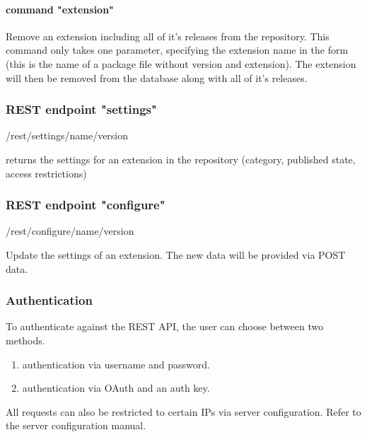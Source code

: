 \paragraph{command "extension"}
Remove an extension including all of it's releases from the repository. This command only takes one parameter, specifying the extension name in the form  (this is the name of a package file without version and extension). The extension will then be removed from the database along with all of it's releases.


\subsubsection[sec:repository rest api endpoint settings]{REST endpoint "settings"}

/rest/settings/name/version

returns the settings for an extension in the repository (category, published state, access restrictions)

\subsubsection[sec:repository rest api endpoint configure]{REST endpoint "configure"}

/rest/configure/name/version

Update the settings of an extension. The new data will be provided via POST data.

\subsubsection[sec:repository rest api authentication]{Authentication}

To authenticate against the REST API, the user can choose between two methods.
\begin{enumerate}
\item authentication via username and password.
\item authentication via OAuth and an auth key.
\end{enumerate}

All requests can also be restricted to certain IPs via server configuration. Refer to the server configuration manual.

